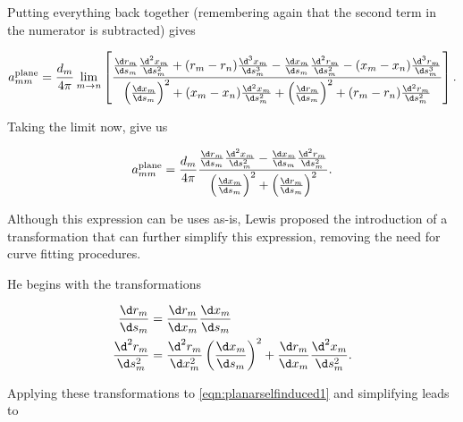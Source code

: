 \noindent Putting everything back together (remembering again that the second term in the numerator is subtracted) gives

\begin{equation}
    a^\text{plane}_{mm} = \frac{d_m}{4 \pi} \lim_{m\rightarrow n} \left[\frac{\frac{\d r_m}{\d s_m} \frac{\d^2 x_m}{\d s_m^2}+(r_m-r_n)\frac{\d^3 x_m}{\d s_m^3}-\frac{\d x_m}{\d s_m} \frac{\d^2 r_m}{\d s_m^2}-(x_m-x_n)\frac{\d^3 r_m}{\d s_m^3}}{\left(\frac{\d x_m}{\d s_m}\right)^2+(x_m-x_n)\frac{\d^2 x_m}{\d s_m^2}+\left(\frac{\d r_m}{\d s_m}\right)^2+(r_m-r_n)\frac{\d^2 r_m}{\d s_m^2}}\right].
\end{equation}

Taking the limit now, give us

\begin{equation}
    \label{eqn:planarselfinduced1}
    a^\text{plane}_{mm} = \frac{d_m}{4 \pi} \frac{\frac{\d r_m}{\d s_m} \frac{\d^2 x_m}{\d s_m^2}-\frac{\d x_m}{\d s_m} \frac{\d^2 r_m}{\d s_m^2}}{\left(\frac{\d x_m}{\d s_m}\right)^2+\left(\frac{\d r_m}{\d s_m}\right)^2}.
\end{equation}


Although this expression can be uses as-is, Lewis \cite{Lewis_1991} proposed the introduction of a transformation that can further simplify this expression, removing the need for curve fitting procedures.

He begins with the transformations

\begin{align}
    \frac{\d r_m}{\d s_m} &= \frac{\d r_m}{\d x_m}\frac{\d x_m}{\d s_m}\\
    \frac{\d^2 r_m}{\d s_m^2} &= \frac{\d^2 r_m}{\d x_m^2}\left(\frac{\d x_m}{\d s_m}\right)^2 + \frac{\d r_m}{\d x_m}\frac{\d^2 x_m}{\d s_m^2}.
\end{align}

Applying these transformations to \cref{eqn:planarselfinduced1} and simplifying leads to

